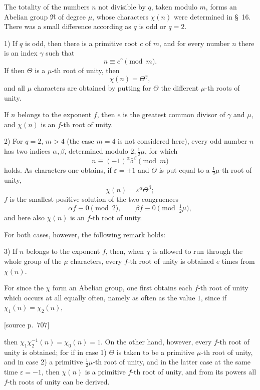 \documentclass[11pt]{article}
\newcommand{\srcpage}[1]{\par\medskip\noindent\textsf{[source p.~#1]}\par\smallskip}
\begin{document}
The totality of the numbers $n$ not divisible by $q$, taken modulo $m$, forms an Abelian group $\mathfrak R$ of degree $\mu$, whose characters $\chi(n)$ were determined in \S~16. There was a small difference according as $q$ is odd or $q=2$.

1) If $q$ is odd, then there is a primitive root $c$ of $m$, and for every number $n$ there is an index $\gamma$ such that
\begin{equation}
n\equiv c^\gamma\pmod m.
\tag{5}
\end{equation}
If then $\Theta$ is a $\mu$-th root of unity, then
\begin{equation}
\chi(n)=\Theta^\gamma,
\tag{6}
\end{equation}
and all $\mu$ characters are obtained by putting for $\Theta$ the different $\mu$-th roots of unity.

If $n$ belongs to the exponent $f$, then $e$ is the greatest common divisor of $\gamma$ and $\mu$, and $\chi(n)$ is an $f$-th root of unity.

2) For $q=2$, $m>4$ (the case $m=4$ is not considered here), every odd number $n$ has two indices $\alpha,\beta$, determined modulo $2,\frac12\mu$, for which
\begin{equation}
n\equiv(-1)^\alpha 5^\beta\pmod m
\tag{7}
\end{equation}
holds. As characters one obtains, if $\varepsilon=\pm1$ and $\Theta$ is put equal to a $\frac12\mu$-th root of unity,
\begin{equation}
\chi(n)=\varepsilon^\alpha\Theta^\beta;
\tag{8}
\end{equation}
$f$ is the smallest positive solution of the two congruences
\[
\alpha f\equiv0\pmod2,\qquad \beta f\equiv0\pmod{\tfrac12\mu},
\]
and here also $\chi(n)$ is an $f$-th root of unity.

For both cases, however, the following remark holds:

3) If $n$ belongs to the exponent $f$, then, when $\chi$ is allowed to run through the whole group of the $\mu$ characters, every $f$-th root of unity is obtained $e$ times from $\chi(n)$.

For since the $\chi$ form an Abelian group, one first obtains each $f$-th root of unity which occurs at all equally often, namely as often as the value $1$, since if $\chi_1(n)=\chi_2(n)$,

\srcpage{707}
then $\chi_1\chi_2^{-1}(n)=\chi_0(n)=1$. On the other hand, however, every $f$-th root of unity is obtained; for if in case 1) $\Theta$ is taken to be a primitive $\mu$-th root of unity, and in case 2) a primitive $\frac12\mu$-th root of unity, and in the latter case at the same time $\varepsilon=-1$, then $\chi(n)$ is a primitive $f$-th root of unity, and from its powers all $f$-th roots of unity can be derived.
\end{document}
